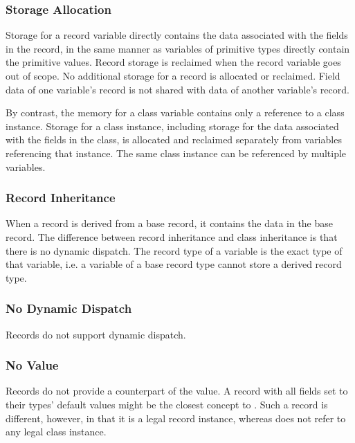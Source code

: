 \subsubsection{Storage Allocation}
\label{Record_Storage}

Storage for a record variable directly contains the data associated
with the fields in the record, in the same manner as variables
of primitive types directly contain the primitive values.
Record storage is reclaimed when the record variable goes out of scope.
No additional storage for a record is allocated or reclaimed.
Field data of one variable's record is not shared with data
of another variable's record.

By contrast, the memory for a class variable contains only a reference to a
class instance.  Storage for a class instance, including storage for
the data associated with the fields in the class, is allocated and reclaimed
separately from variables referencing that instance.  The same class instance
can be referenced by multiple variables.

\subsubsection{Record Inheritance}
\label{Record_Inheritance}

When a record is derived from a base record, it contains the data in
the base record.  The difference between record inheritance and class
inheritance is that there is no dynamic dispatch.  The record type of
a variable is the exact type of that variable, i.e. a variable of a
base record type cannot store a derived record type.

\subsubsection{No Dynamic Dispatch}

Records do not support dynamic dispatch.

\subsubsection{No  Value}

Records do not provide a counterpart of the  value.  A record
with all fields set to their types' default values might be the closest
concept to . Such a record is different, however, in that it is
a legal record instance, whereas  does not refer to any
legal class instance.

